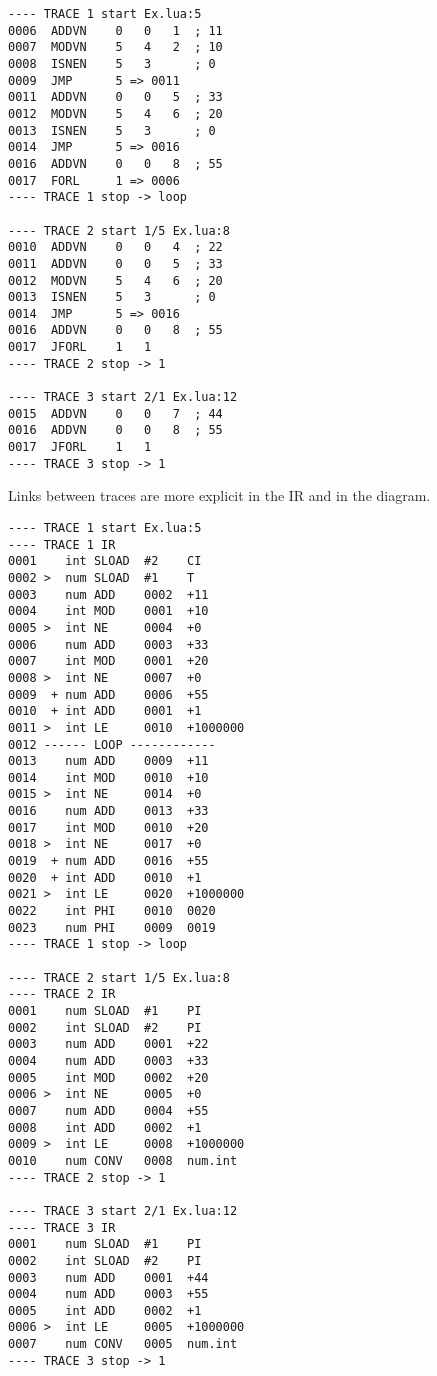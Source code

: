 \begin{multicols}{2}
\begin{lstlisting}[style=DumpStyle]
---- TRACE 1 start Ex.lua:5
0006  ADDVN    0   0   1  ; 11
0007  MODVN    5   4   2  ; 10
0008  ISNEN    5   3      ; 0
0009  JMP      5 => 0011
0011  ADDVN    0   0   5  ; 33
0012  MODVN    5   4   6  ; 20
0013  ISNEN    5   3      ; 0
0014  JMP      5 => 0016
0016  ADDVN    0   0   8  ; 55
0017  FORL     1 => 0006
---- TRACE 1 stop -> loop

---- TRACE 2 start 1/5 Ex.lua:8
0010  ADDVN    0   0   4  ; 22
0011  ADDVN    0   0   5  ; 33
0012  MODVN    5   4   6  ; 20
0013  ISNEN    5   3      ; 0
0014  JMP      5 => 0016
0016  ADDVN    0   0   8  ; 55
0017  JFORL    1   1
---- TRACE 2 stop -> 1

---- TRACE 3 start 2/1 Ex.lua:12
0015  ADDVN    0   0   7  ; 44
0016  ADDVN    0   0   8  ; 55
0017  JFORL    1   1
---- TRACE 3 stop -> 1
\end{lstlisting}
\end{multicols}

\noindent
Links between traces are more explicit in the IR and in the diagram.

\begin{multicols}{2}
\begin{lstlisting}[style=DumpStyle]
---- TRACE 1 start Ex.lua:5
---- TRACE 1 IR
0001    int SLOAD  #2    CI
0002 >  num SLOAD  #1    T
0003    num ADD    0002  +11 
0004    int MOD    0001  +10 
0005 >  int NE     0004  +0  
0006    num ADD    0003  +33 
0007    int MOD    0001  +20 
0008 >  int NE     0007  +0  
0009  + num ADD    0006  +55 
0010  + int ADD    0001  +1  
0011 >  int LE     0010  +1000000
0012 ------ LOOP ------------
0013    num ADD    0009  +11 
0014    int MOD    0010  +10 
0015 >  int NE     0014  +0  
0016    num ADD    0013  +33 
0017    int MOD    0010  +20 
0018 >  int NE     0017  +0  
0019  + num ADD    0016  +55 
0020  + int ADD    0010  +1  
0021 >  int LE     0020  +1000000
0022    int PHI    0010  0020
0023    num PHI    0009  0019
---- TRACE 1 stop -> loop

---- TRACE 2 start 1/5 Ex.lua:8
---- TRACE 2 IR
0001    num SLOAD  #1    PI
0002    int SLOAD  #2    PI
0003    num ADD    0001  +22 
0004    num ADD    0003  +33 
0005    int MOD    0002  +20 
0006 >  int NE     0005  +0  
0007    num ADD    0004  +55 
0008    int ADD    0002  +1  
0009 >  int LE     0008  +1000000
0010    num CONV   0008  num.int
---- TRACE 2 stop -> 1

---- TRACE 3 start 2/1 Ex.lua:12
---- TRACE 3 IR
0001    num SLOAD  #1    PI
0002    int SLOAD  #2    PI
0003    num ADD    0001  +44 
0004    num ADD    0003  +55 
0005    int ADD    0002  +1  
0006 >  int LE     0005  +1000000
0007    num CONV   0005  num.int
---- TRACE 3 stop -> 1
\end{lstlisting}
\end{multicols}

